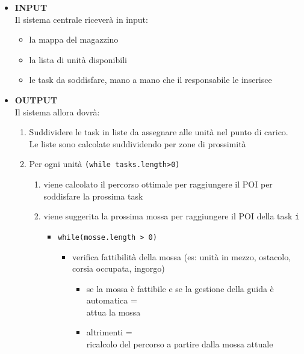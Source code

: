 \begin{itemize}
	\item{\textbf{INPUT}\\
	Il sistema centrale riceverà in input:
	\begin{itemize}
		\item{la mappa del magazzino\\}
		\item{la lista di unità disponibili\\}
		\item{le task da soddisfare, mano a mano che il responsabile le inserisce\\}
	\end{itemize}
	}
	\item{\textbf{OUTPUT}\\
	Il sistema allora dovrà:
	\begin{enumerate}
		\item{Suddividere le task in liste da assegnare alle unità nel punto di carico. \\
		Le liste sono calcolate suddividendo per zone di prossimità\\}
		\item{Per ogni unità \texttt{(while tasks.length>0)}\\}
		\begin{enumerate}
			\item{viene calcolato il percorso ottimale per raggiungere il POI per soddisfare la prossima task\\}
			\item{viene suggerita la prossima mossa per raggiungere il POI della task \texttt{i}\\}	
			\begin{itemize}
				\item{\texttt{while(mosse.length > 0)}\\}
				\begin{itemize}
					\item{verifica fattibilità della mossa (es: unità in mezzo, ostacolo, corsia occupata, ingorgo)\\}
					\begin{itemize}
						\item{se la mossa è fattibile e se la gestione della guida è automatica = \\
						 attua la mossa\\}
						\item{altrimenti = \\
						ricalcolo del percorso a partire dalla mossa attuale\\}									\end{itemize}

\end{itemize}
\end{itemize}
\end{enumerate}
\end{enumerate}}
\end{itemize}
